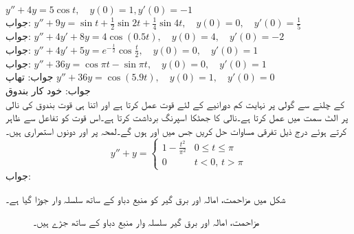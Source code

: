 \quad
$y''+4y=5\cos t,\quad y(0)=1,y'(0)=-1$\\
جواب:
\quad
$y''+9y=\sin t+\frac{1}{2}\sin 2t+\frac{1}{4}\sin 4t, \quad y(0)=0, \quad y'(0)=\frac{1}{5}$\\
جواب:
\quad
$y''+4y'+8y=4\cos( 0.5t), \quad y(0)=4, \quad y'(0)=-2$\\
جواب:
\quad
$y''+4y'+5y=e^{-\frac{t}{2}}\cos \frac{t}{2}, \quad y(0)=0, \quad y'(0)=1$\\
جواب:
\quad
$y''+36y=\cos \pi t-\sin \pi t, \quad y(0)=0, \quad y'(0)=1$\\
جواب:
\quad تھاپ \quad
$y''+36y=\cos (5.9t), \quad y(0)=1, \quad y'(0)=0$\\
جواب:
\quad خود کار بندوق \\
 کے چلنے سے گولی پر نہایت کم دورانیے کے لئے  قوت عمل کرتا ہے اور اتنا ہی قوت بندوق کی نالی پر الٹ سمت میں عمل کرتا ہے۔نالی کا جھٹکا اسپرنگ برداشت کرتا ہے۔اس قوت کو تفاعل  سے ظاہر کرتے ہوئے درج ذیل تفرقی مساوات حل کریں جس میں  اور  ہوں گے۔لمحہ  پر  اور  دونوں استمراری ہیں۔
\begin{equation*}
y''+y=
\begin{cases}
1-\frac{t^2}{\pi^2} & 0 \le t \le \pi\\
0 & t<0, \, t>\pi
\end{cases}
\end{equation*}
جواب:

شکل  میں  مزاحمت، امالہ اور برق گیر  کو منبع دباو کے ساتھ سلسلہ وار جوڑا گیا ہے۔
\begin{figure}
\centering
{}
\caption{مزاحمت، امالہ اور برق گیر سلسلہ وار منبع دباو کے ساتھ جڑے ہیں۔}
\label{شکل_سادہ_دو_سلسلہ_وار_دور_الف}
\end{figure}
